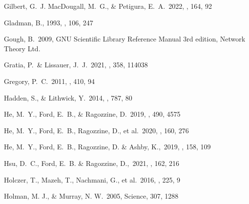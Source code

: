 \documentclass{aastex62}
\begin{document}
\begin{thebibliography}{}

 Gilbert, G.~J. MacDougall, M.~G., \& Petigura, E.~A.~2022, \aj, 164, 92

 Gladman, B., 1993, \icarus, 106, 247

 Gough, B.~2009, GNU Scientific Library Reference Manual 3rd edition, Network Theory Ltd.

 Gratia, P.~\& Lissauer, J.~J.~2021,  \icarus,  358, 114038

 Gregory, P.~C.~2011, \mnras, 410, 94

 Hadden, S., \& Lithwick, Y.~2014, \apj, 787, 80

 He, M.~Y., Ford, E.~B., \& Ragozzine, D.\ 2019, \mnras, 490, 4575 %

 He, M.~Y., Ford, E.~B., Ragozzine, D., et al.~2020, \aj, 160, 276 %

 He, M.~Y., Ford, E.~B., Ragozzine, D. \& Ashby, K.,~2019, \aj, 158, 109


 Hsu, D.~C., Ford, E.~B. \& Ragozzine, D.,~2021, \aj, 162, 216

 Holczer, T., Mazeh, T., Nachmani, G., et al.\ 2016, \apjs, 225, 9

 Holman, M. J., \& Murray, N. W.~2005, Science, 307, 1288 








\end{thebibliography}
\end{document}
